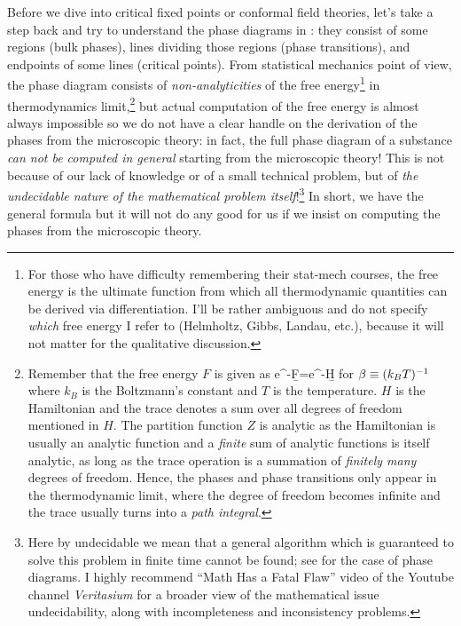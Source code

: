 \documentclass[12pt]{article}
\numberwithin{equation}{section}
\begin{document}
Before we dive into critical fixed points or conformal field theories, let's take a step back and try to understand the phase diagrams in \figref{\ref{fig: phase diagram}}: they consist of some regions (bulk phases), lines dividing those regions (phase transitions), and endpoints of some lines (critical points).  From statistical mechanics point of view, the phase diagram consists of \emph{non-analyticities} of the free energy\footnote{For those who have difficulty remembering their stat-mech courses, the free energy is the ultimate function from which all thermodynamic quantities can be derived via differentiation. I'll be rather ambiguous and do not specify \emph{which} free energy I refer to (Helmholtz, Gibbs, Landau, etc.), because it will not matter for the qualitative discussion.} in thermodynamics limit,\footnote{Remember that the free energy $F$ is given as 
\be 
e^{-\b F}=\Tr e^{-\b H}
\ee 
for $\beta\equiv (k_B T)^{-1}$ where $k_B$ is the Boltzmann's constant and $T$ is the temperature. $H$ is the Hamiltonian and the trace denotes a sum over all degrees of freedom mentioned in $H$. The partition function $Z$ is analytic as the Hamiltonian is usually an analytic function and a \emph{finite} sum of analytic functions is itself analytic, as long as the trace operation is a summation of \emph{finitely many} degrees of freedom. Hence, the phases and phase transitions only appear in the thermodynamic limit, where the degree of freedom becomes infinite and the trace usually turns into a \emph{path integral}.
} but actual computation of the free energy is almost always impossible so we do not have a clear handle on the derivation of the phases from the microscopic theory: in fact, the full phase diagram of a substance \emph{can not be computed in general} starting from the microscopic theory! This is not because of our lack of knowledge or of a small technical problem, but  of \emph{the undecidable nature of the mathematical problem itself}!\footnote{
\label{footnote: decidability}
Here by undecidable we mean that a general algorithm which is guaranteed to solve this problem in finite time cannot be found; see \cite{bausch2021uncomputability} for the case of phase diagrams. I highly recommend ``Math Has a Fatal Flaw'' video of the Youtube channel \emph{Veritasium} for a broader view of the mathematical issue undecidability, along with incompleteness and inconsistency problems.
} In short, we have the general formula but it will not do any good for us if we insist on computing the phases from the microscopic theory.
\end{document}
